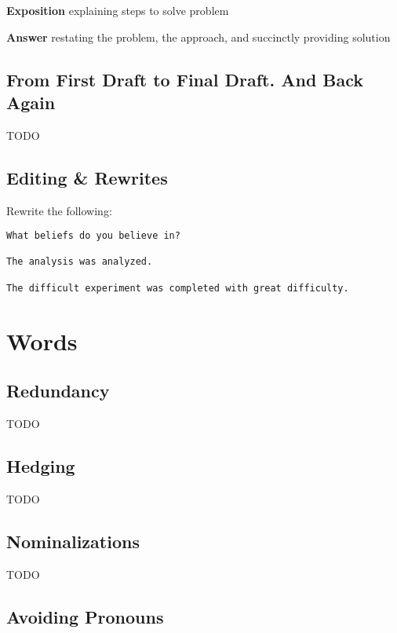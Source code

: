 \documentclass[10pt,a4paper]{book}
\begin{document}
\textbf{Exposition} explaining steps to solve problem

\textbf{Answer} restating the problem, the approach, and succinctly providing solution


\section{From First Draft to Final Draft. And Back Again}

\color{BrickRed}TODO\color{black}


\section{Editing \& Rewrites}

Rewrite the following:
\begin{verbatim}
What beliefs do you believe in?

The analysis was analyzed.

The difficult experiment was completed with great difficulty.
\end{verbatim}



\chapter{Words}



\section{Redundancy}\label{Redundancy}

\color{BrickRed}TODO\color{black}



\section{Hedging}\label{Hedging}

\color{BrickRed}TODO\color{black}


\section{Nominalizations}

\color{BrickRed}TODO\color{black}


\section{Avoiding Pronouns}\label{Avoiding Pronouns}
\end{document}
